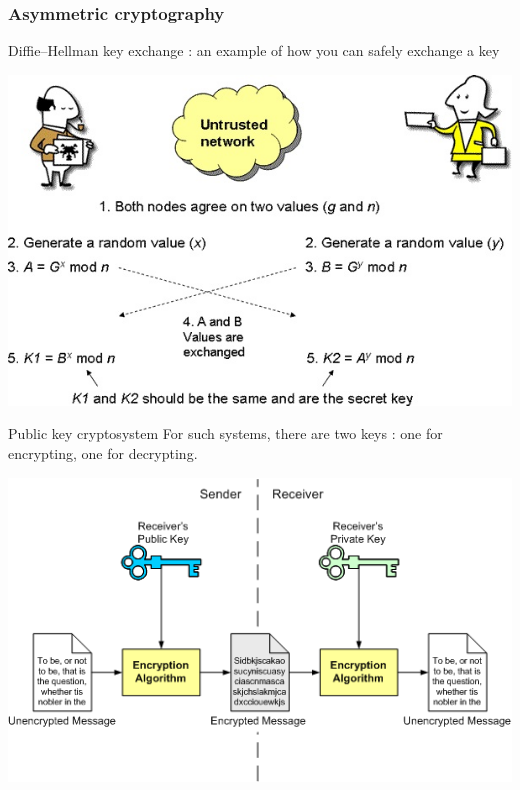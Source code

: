 \documentclass[compress]{beamer}
\theoremstyle{definition}
\theoremstyle{definition}
\theoremstyle{definition}
\theoremstyle{remark}
\theoremstyle{remark}
\theoremstyle{definition}
\theoremstyle{definition}
\theoremstyle{definition}
\theoremstyle{definition}
\theoremstyle{definition}
\theoremstyle{remark}
\theoremstyle{remark}
\theoremstyle{remark}
\theoremstyle{remark}
\begin{document}
				\subsubsection{Asymmetric cryptography}
				\begin{frame}
					Diffie–Hellman key exchange : an example of how you can safely exchange a key
					\begin{center}\includegraphics[scale=1]{./diffie1}\end{center}
				\end{frame}
				\begin{frame}
					\begin{block}{Public key cryptosystem}
						For such systems, there are two keys : one for encrypting, one for decrypting.
					\end{block}
					\begin{center}\includegraphics[scale=1.4]{./asymmetric}\end{center}
				\end{frame}
\end{document}
